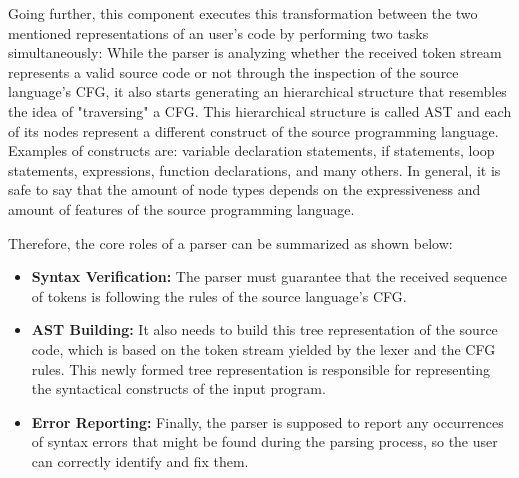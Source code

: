 Going further, this component executes this transformation between the two mentioned representations of an user's code by performing two tasks simultaneously: While the parser is analyzing whether the received token stream represents a valid source code or not through the inspection of the source language's CFG, it also starts generating an hierarchical structure that resembles the idea of "traversing" a CFG. This hierarchical structure is called AST and each of its nodes represent a different construct of the source programming language. Examples of constructs are: variable declaration statements, if statements, loop statements, expressions, function declarations, and many others. In general, it is safe to say that the amount of node types depends on the expressiveness and amount of features of the source programming language.

Therefore, the core roles of a parser can be summarized as shown below:
\begin{itemize}
    \item \textbf{Syntax Verification:} The parser must guarantee that the received sequence of tokens is following the rules of the source language's CFG.
    
    \item \textbf{AST Building:} It also needs to build this tree representation of the source code, which is based on the token stream yielded by the lexer and the CFG rules. This newly formed tree representation is responsible for representing the syntactical constructs of the input program.
    
    \item \textbf{Error Reporting:} Finally, the parser is supposed to report any occurrences of syntax errors that might be found during the parsing process, so the user can correctly identify and fix them.

\end{itemize}


